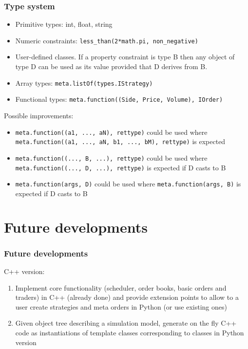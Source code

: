 \documentclass{beamer}
\begin{document}
\begin{frame}
\frametitle{Type system}
\begin{itemize}
  \item Primitive types: int, float, string
  \item Numeric constraints: \texttt{less\_than(2*math.pi, non\_negative)}
  \item User-defined classes. If a property constraint is type B then any object of type D can be used as its value provided that D derives from B.
  \item Array types: \texttt{meta.listOf(types.IStrategy)}
  \item Functional types: \texttt{meta.function((Side, Price, Volume), IOrder)}
\end{itemize}
Possible improvements:
\begin{itemize}
  \item \texttt{meta.function((a1, ..., aN), rettype)} could be used where \texttt{meta.function((a1, ..., aN, b1, ..., bM), rettype)} is expected
  \item \texttt{meta.function((..., B, ...), rettype)} could be used where \texttt{meta.function((..., D, ...), rettype)} is expected if D casts to B
  \item \texttt{meta.function(args, D)} could be used where \texttt{meta.function(args, B)} is expected if D casts to B
\end{itemize}
\end{frame}

\section{Future developments}
\begin{frame}
\frametitle{Future developments}
C++ version:
\begin{enumerate}
  \item Implement core functionality (scheduler, order books, basic orders and traders) in C++ (already done) and provide extension points to allow to a user create strategies and meta orders in Python (or use existing ones)
  \item Given object tree describing a simulation model, generate on the fly C++ code as instantiations of template classes corresponding to classes in Python version
\end{enumerate}
\end{frame}
\end{document}
